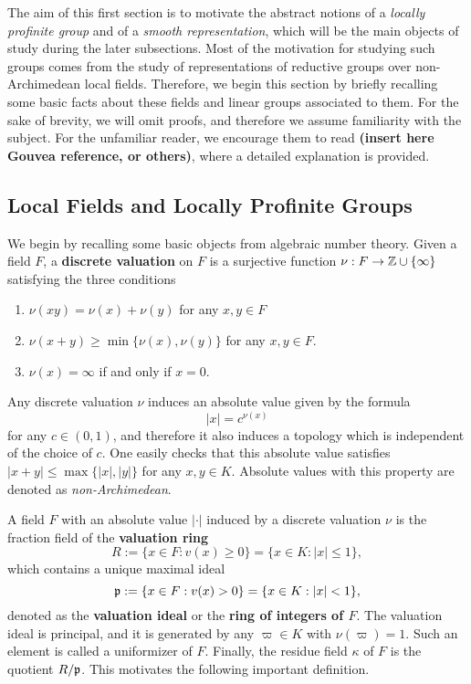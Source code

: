 The aim of this first section is to motivate the abstract notions of a \textit{locally profinite group} and of a \textit{smooth representation}, which will be the main objects of study during the later subsections. Most of the motivation for studying such groups comes from the study of representations of reductive groups over non-Archimedean local fields. Therefore, we begin this section by briefly recalling some basic facts about these fields and linear groups associated to them. For the sake of brevity, we will omit proofs, and therefore we assume familiarity with the subject. For the unfamiliar reader, we encourage them to read \textbf{(insert here Gouvea reference, or others)}, where a detailed explanation is provided. 


\subsection{Local Fields and Locally Profinite Groups}
We begin by recalling some basic objects from algebraic number theory. Given a field $F$, a \textbf{discrete valuation} on $F$ is a surjective function $\nu: F\to\mathbb{Z}\cup\{\infty\}$ satisfying the three conditions

\begin{enumerate}
    \item $\nu(xy)=\nu(x)+\nu(y)$ for any $x,y\in F$ 
    \item $\nu(x+y)\geq\min\{\nu(x),\nu(y)\}$ for any $x,y\in F$.
    \item $\nu(x)=\infty$ if and only if $x=0$.
\end{enumerate}

Any discrete valuation $\nu$ induces an absolute value given by the formula 
$$|x|=c^{\nu(x)}$$ 
for any $c\in(0,1)$, and therefore it also induces a topology which is independent of the choice of $c$. One easily checks that this absolute value satisfies $|x+y|\leq\max\{|x|,|y|\}$ for any $x,y\in K$. Absolute values with this property are denoted as \textit{non-Archimedean}. 

A field $F$ with an absolute value $|\cdot|$ induced by a discrete valuation $\nu$ is the fraction field of the \textbf{valuation ring}
$$R:=\{x\in F:v(x)\geq 0\}=\{x\in K: |x|\leq1\},$$ 
which contains a unique maximal ideal
$$\mathfrak{p}:=\{x\in F:v(x)> 0\}=\{x\in K: |x|<1\},$$
denoted as the \textbf{valuation ideal} or the \textbf{ring of integers of $F$}. The valuation ideal is principal, and it is generated by any $\varpi\in K$ with $\nu(\varpi)=1$. Such an element is called a uniformizer of $F$. Finally, the residue field $\kappa$ of $F$ is the quotient $R/\mathfrak{p}$. This motivates the following important definition.

